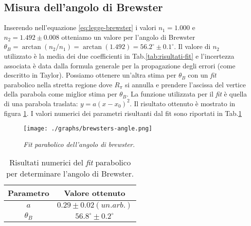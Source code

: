 \subsection{Misura dell'angolo di Brewster}\label{subsec:angolo-di-brewster}
  Inserendo nell'equazione \eqref{eq:legge-brewster} i valori $n_1 = 1.000$ e $n_2 = 1.492 \pm 0.008$
  otteniamo un valore per l'angolo di Brewster $\theta_B = \arctan{(n_2 / n_1)} = \arctan{(1.492)} = 56.2^\circ \pm 0.1^\circ$. Il valore di $n_2$ utilizzato è la media
  dei due coefficienti in Tab.\ref{tab:risultati-fit} e l'incertezza associata è data dalla formula generale per la
  propagazione degli errori (come descritto in Taylor\cite{taylor99}).
  Possiamo ottenere un'altra stima per $\theta_B$ con un \emph{fit} parabolico nella stretta regione
  dove $R_\pi$ si annulla e prendere l'ascissa del vertice della parabola come miglior stima per $\theta_B$.
  La funzione utilizzata per il \emph{fit} è quella di una parabola traslata: $y = a(x - x_0)^2$.
  Il risultato ottenuto è mostrato in figura \ref{fig:brewsters-angle}. I valori numerici
  dei parametri risultanti dal fit sono riportati in Tab.\ref{tab:fit-brewster}
  \begin{figure}[h]
    \centering
    \texttt{[image: ./graphs/brewsters-angle.png]}
    \caption{\emph{Fit parabolico dell'angolo di brewster.}}
    \label{fig:brewsters-angle}
  \end{figure}
  \begin{table}[ht]
    \centering
    \begin{tabular}[t]{cc}
      \toprule
      Parametro &Valore ottenuto\\
      \midrule
      $a$ &$0.29 \pm 0.02 (un. arb.)$ \\
      $\theta_B$ &$56.8^\circ \pm 0.2^\circ$ \\
      \bottomrule
      \end{tabular}
    \caption{
      Risultati numerici del \emph{fit} parabolico per determinare l'angolo di Brewster.
    }
    \label{tab:fit-brewster}
  \end{table}
\endinput



